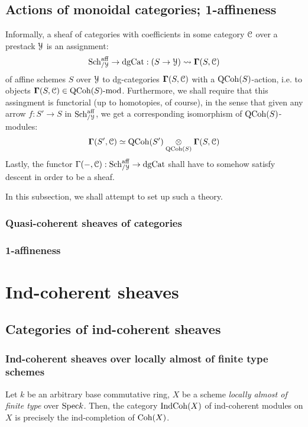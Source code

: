         \subsection{Actions of monoidal categories; 1-affineness}
            Informally, a sheaf of categories with coefficients in some category $\mathcal{C}$ over a prestack $\mathcal{Y}$ is an assignment:
                $$\mathrm{Sch}^{\mathrm{aff}}_{/\mathcal{Y}} \to \mathrm{dg}\mathrm{Cat}: (S \to \mathcal{Y}) \leadsto \mathbf{\Gamma}(S, \mathcal{C})$$
            of affine schemes $S$ over $\mathcal{Y}$ to dg-categories $\mathbf{\Gamma}(S, \mathcal{C})$ with a $\mathrm{QCoh}(S)$-action, i.e. to objects $\mathbf{\Gamma}(S, \mathcal{C}) \in \mathrm{QCoh}(S)\text{-}\mathrm{mod}$. Furthermore, we shall require that this assingment is functorial (up to homotopies, of course), in the sense that given any arrow $f: S' \to S$ in $\mathrm{Sch}^{\mathrm{aff}}_{/\mathcal{Y}}$, we get a corresponding isomorphism of $\mathrm{QCoh}(S)$-modules:
                $$\bfGamma(S', \C) \cong \QCoh(S') \tensor_{\QCoh(S)} \bfGamma(S, \C)$$
            Lastly, the functor $\Gamma(-, \mathcal{C}): \mathrm{Sch}^{\mathrm{aff}}_{/\mathcal{Y}} \to \mathrm{dg}\mathrm{Cat}$ shall have to somehow satisfy descent in order to be a sheaf. 
            
            In this subsection, we shall attempt to set up such a theory.
            
            \subsubsection{Quasi-coherent sheaves of categories}
            
            \subsubsection{1-affineness}
        
    \section{Ind-coherent sheaves} \label{section: indcoh}
        \subsection{Categories of ind-coherent sheaves} \label{subsection: categories_of_ind_coherent_sheaves}
            \subsubsection{Ind-coherent sheaves over locally almost of finite type schemes}
                \begin{definition} \label{def: ind_coherent_sheaves_on_laft_schemes}
                    Let $k$ be an arbitrary base commutative ring, $X$ be a scheme \textit{locally almost of finite type} over $\mathrm{Spec} k$. Then, the category $\mathrm{Ind}\mathrm{Coh}(X)$ of ind-coherent modules on $X$ is precisely the ind-completion of $\mathrm{Coh}(X)$. 
                \end{definition}
            
